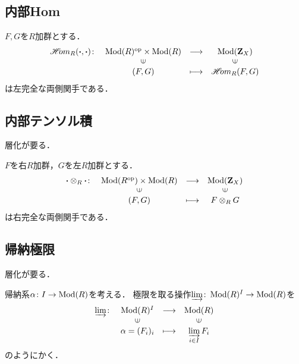 \subsection{内部Hom}
\begin{PRP}[Homは左完全]
    $F,G$を$R$加群とする．
    \begin{equation*}
        \begin{array}{rccc}
            \HOM_R({\boldsymbol{\cdot}},{\boldsymbol{\cdot}})\colon
            &\Mod(R)^{\op}\times\Mod(R)
            &\longrightarrow&\Mod(\zz_X)\\
            &\rotatebox{90}{$\in$}&&\rotatebox{90}{$\in$}\\
            & (F,G)&\longmapsto&\HOM_R(F,G)
        \end{array}
    \end{equation*}
    は左完全な両側関手である．
\end{PRP}

\subsection{内部テンソル積}
層化が要る．

\begin{PRP}
    $F$を右$R$加群，$G$を左$R$加群とする．
    \begin{equation*}
        \begin{array}{rccc}
            {\boldsymbol{\cdot}}\otimes_R{\boldsymbol{\cdot}}\colon
            &\Mod(R^{\op})\times\Mod(R)
            &\longrightarrow&\Mod(\zz_X)\\
            &\rotatebox{90}{$\in$}&&\rotatebox{90}{$\in$}\\
            & (F,G)&\longmapsto&F\otimes_R G
        \end{array}
    \end{equation*}
    は右完全な両側関手である．
\end{PRP}

\subsection{帰納極限}
層化が要る．

帰納系$\alpha\colon I\to \mathop{\mathrm{Mod}}\nolimits(R)$を考える．
極限を取る操作$\varinjlim\colon\mathop{\mathrm{Mod}}\nolimits(R)^I\to\mathop{\mathrm{Mod}}\nolimits(R)$を
\begin{equation*}
    \begin{array}{rccc}
        \varinjlim\colon&\Mod(R)^I&\longrightarrow&\Mod(R)\\
            &\rotatebox{90}{$\in$}&&\rotatebox{90}{$\in$}\\
            &\alpha=(F_i)_i &\longmapsto&\varinjlim\limits_{i\in I}F_i
    \end{array}
\end{equation*}
のようにかく．

